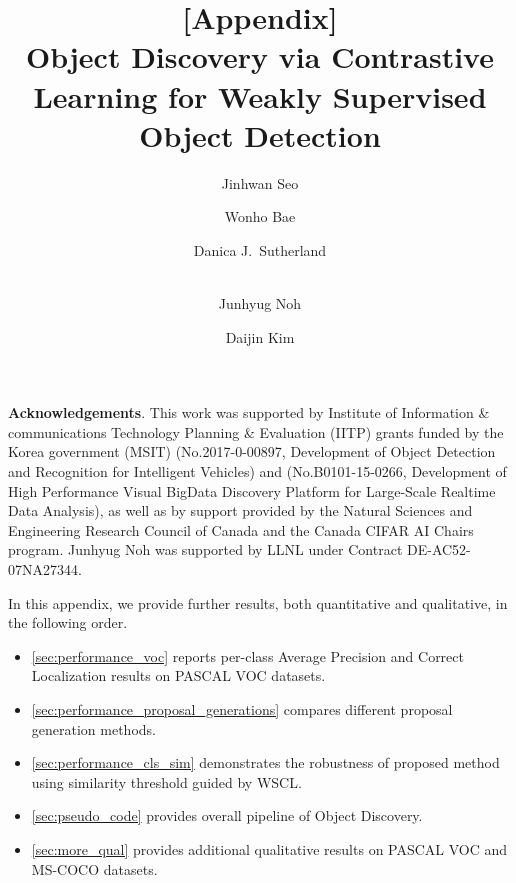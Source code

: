 \documentclass[runningheads]{llncs}
\makeatletter
\newcommand{\printfnsymbol}[1]{\textsuperscript{\@fnsymbol{#1}}}
\makeatother
\begin{document}
\smallskip
\noindent\textbf{Acknowledgements}.
This work was supported by Institute of Information \& communications Technology Planning \& Evaluation (IITP) grants funded by the Korea government (MSIT) (No.2017-0-00897, Development of Object Detection and Recognition for Intelligent Vehicles) and (No.B0101-15-0266, Development of High Performance Visual BigData Discovery Platform for Large-Scale Realtime Data Analysis),
as well as by support provided by the Natural Sciences and Engineering Research Council of Canada
and the Canada CIFAR AI Chairs program.
Junhyug Noh was supported by LLNL under Contract DE-AC52-07NA27344.

\clearpage



\def\thesection{\Alph{section}}


\title{
[Appendix] \\
Object Discovery via Contrastive Learning for Weakly Supervised Object Detection}
\author{Jinhwan Seo
\and
Wonho Bae 
\and
Danica J.\ Sutherland 
\and\\
Junhyug Noh\printfnsymbol{1}
\and
Daijin Kim\printfnsymbol{1}
}
\maketitle

In this appendix, we provide further results, both quantitative and qualitative, in the following order.
\begin{itemize}
\item \cref{sec:performance_voc} reports  per-class Average Precision and Correct Localization results on PASCAL VOC datasets.

    \item \cref{sec:performance_proposal_generations} compares different proposal generation methods.
    
    \item \cref{sec:performance_cls_sim} demonstrates the robustness of proposed method using similarity threshold guided by WSCL. 
    
    \item \cref{sec:pseudo_code} provides overall pipeline of Object Discovery.
    
    \item \cref{sec:more_qual} provides additional qualitative results on PASCAL VOC and MS-COCO datasets.
    
\end{itemize}
\end{document}
